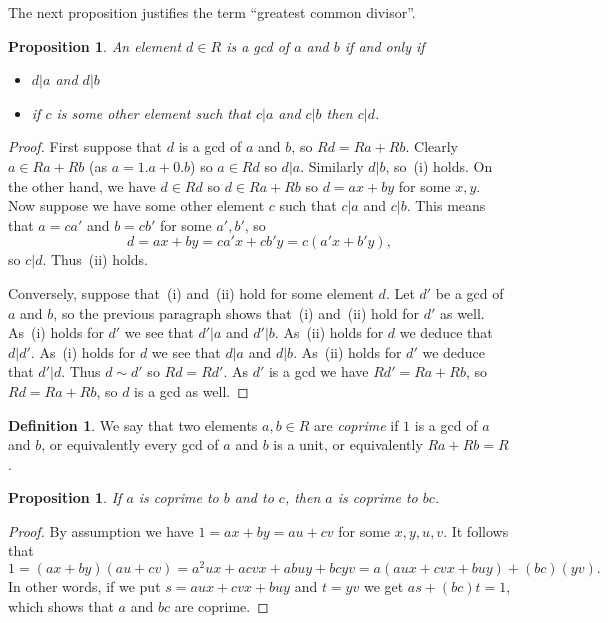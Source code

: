 \documentclass{amsart}
\renewcommand{\:}{\colon}
\newtheorem{proposition}[theorem]{Proposition}
\theoremstyle{definition}
\newtheorem{definition}[theorem]{Definition}
\begin{document}
The next proposition justifies the term ``greatest common divisor''.
\begin{proposition}
 An element $d\in R$ is a gcd of $a$ and $b$ if and only if
 \begin{itemize}
  \item[(i)]  $d|a$ and $d|b$
  \item[(ii)] if $c$ is some other element such that $c|a$ and $c|b$
   then $c|d$.
 \end{itemize}
\end{proposition}
\begin{proof}
 First suppose that $d$ is a gcd of $a$ and $b$, so $Rd=Ra+Rb$.
 Clearly $a\in Ra+Rb$ (as $a=1.a+0.b$) so $a\in Rd$ so $d|a$.
 Similarly $d|b$, so~(i) holds.  On the other hand, we have $d\in Rd$
 so $d\in Ra+Rb$ so $d=ax+by$ for some $x,y$.  Now suppose we have
 some other element $c$ such that $c|a$ and $c|b$.  This means that
 $a=ca'$ and $b=cb'$ for some $a',b'$, so
 \[ d = ax+by = ca'x+cb'y = c(a'x+b'y), \]
 so $c|d$.  Thus~(ii) holds.

 Conversely, suppose that~(i) and~(ii) hold for some element $d$.  Let
 $d'$ be a gcd of $a$ and $b$, so the previous paragraph shows
 that~(i) and~(ii) hold for $d'$ as well.  As~(i) holds for $d'$ we
 see that $d'|a$ and $d'|b$.  As~(ii) holds for $d$ we deduce that
 $d|d'$.  As~(i) holds for $d$ we see that $d|a$ and $d|b$.  As~(ii)
 holds for $d'$ we deduce that $d'|d$.  Thus $d\sim d'$ so $Rd=Rd'$.
 As $d'$ is a gcd we have $Rd'=Ra+Rb$, so $Rd=Ra+Rb$, so $d$ is a gcd
 as well.
\end{proof}

\begin{definition}\label{defn-coprime}
 We say that two elements $a,b\in R$ are \emph{coprime} if $1$ is a
 gcd of $a$ and $b$, or equivalently every gcd of $a$ and $b$ is a
 unit, or equivalently $Ra+Rb=R$.
\end{definition}

\begin{proposition}\label{prop-coprime-mult}
 If $a$ is coprime to $b$ and to $c$, then $a$ is coprime to $bc$.
\end{proposition}
\begin{proof}
 By assumption we have $1=ax+by=au+cv$ for some $x,y,u,v$.  It follows
 that
 \[ 1=(ax+by)(au+cv)=a^2ux+acvx+abuy+bcyv=a(aux+cvx+buy)+(bc)(yv). \]
 In other words, if we put $s=aux+cvx+buy$ and $t=yv$ we get
 $as+(bc)t=1$, which shows that $a$ and $bc$ are coprime.
\end{proof}
\end{document}
